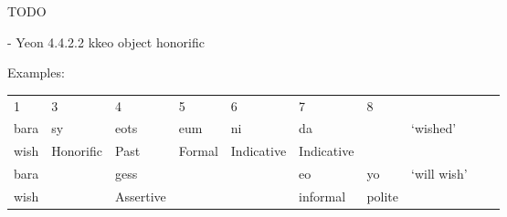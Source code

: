 \documentclass[11pt,letterpaper]{article}
\begin{document}
TODO 

- Yeon 4.4.2.2 kkeo object honorific %



Examples:
\begin{tabular}{llllllllll}
1    & 3 & 4     & 5   & 6  & 7 & 8 \\
bara & sy & eots & eum & ni & da  & &  `wished'\\
wish & Honorific & Past & Formal & Indicative & Indicative \\
bara& & gess &  & &  eo & yo  &  `will wish' \\
wish  & &  Assertive && & informal & polite \\
\end{tabular}
\end{document}
